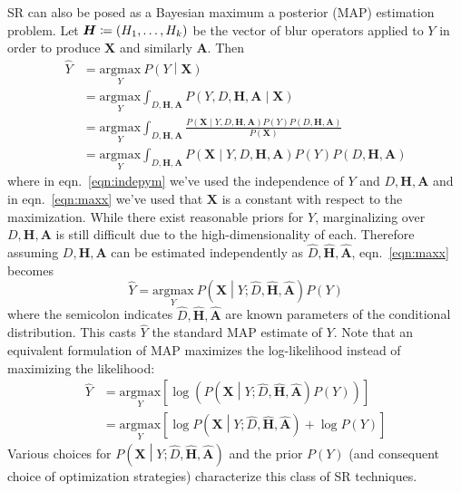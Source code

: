 SR can also be posed as a Bayesian maximum a posterior (MAP) estimation problem.
%
Let $\bm{H} \coloneqq \left( H_1, \mathellipsis, H_k \right)$ be the vector of blur operators applied to $Y$ in order to produce $\bm{X}$ and similarly $\bm{A}$.
%
Then
\begin{align}
    \hat{Y} &= \underset{Y}{\text{argmax}}~P\left( Y \middle| \bm{X} \right) \nonumber \\
    &= \underset{Y}{\text{argmax}} \int_{D, \bm{H}, \bm{A}} P\left( Y, D, \bm{H}, \bm{A} \middle| \bm{X}\right) \nonumber \\
    &= \underset{Y}{\text{argmax}} \int_{D, \bm{H}, \bm{A}} \frac{P\left(\bm{X} \middle| Y, D, \bm{H}, \bm{A} \right)P(Y) P(D, \bm{H}, \bm{A})}{P(\bm{X})}\label{eqn:indepym} \\
    &= \underset{Y}{\text{argmax}} \int_{D, \bm{H}, \bm{A}} P\left(\bm{X} \middle| Y, D, \bm{H}, \bm{A} \right)P(Y) P(D, \bm{H}, \bm{A}) \label{eqn:maxx}
\end{align}
where in eqn.~\ref{eqn:indepym} we've used the independence of $Y$ and $D, \bm{H}, \bm{A}$\cite{Hardie1997} and in eqn.~\ref{eqn:maxx} we've used that $\bm{X}$ is a constant with respect to the maximization.
%
While there exist reasonable priors for $Y$, marginalizing over $D, \bm{H}, \bm{A}$ is still difficult due to the high-dimensionality of each.
%
Therefore assuming $D, \bm{H}, \bm{A}$ can be estimated independently as $\hat{D}, \hat{\bm{H}}, \hat{\bm{A}}$, eqn.~\ref{eqn:maxx} becomes
\begin{equation}
    \hat{Y} = \underset{Y}{\text{argmax}}~P\left(\bm{X} \middle| Y; \hat{D}, \hat{\bm{H}}, \hat{\bm{A}} \right) P(Y)
    \label{eqn:map}
\end{equation}
where the semicolon indicates $\hat{D}, \hat{\bm{H}}, \hat{\bm{A}}$ are known parameters of the conditional distribution.
%
This casts $\hat{Y}$ the standard MAP estimate of $Y$.
%
Note that an equivalent formulation of MAP maximizes the log-likelihood instead of maximizing the likelihood:
\begin{align}
    \hat{Y} &= \underset{Y}{\text{argmax}}\left[ \log\left( P\left(\bm{X} \middle| Y; \hat{D},  \hat{\bm{H}}, \hat{\bm{A}}\right) P(Y) \right) \right]  \nonumber \\
    &=  \underset{Y}{\text{argmax}}\left[ \log{P\left(\bm{X} \middle| Y; \hat{D},  \hat{\bm{H}}, \hat{\bm{A}} \right)} + \log{P(Y)} \right]
    \label{eqn:logmap}
\end{align}
%
Various choices for $P\left(\bm{X} \middle| Y; \hat{D},  \hat{\bm{H}}, \hat{\bm{A}} \right)$ and the prior $P(Y)$ (and consequent choice of optimization strategies) characterize this class of SR techniques.
